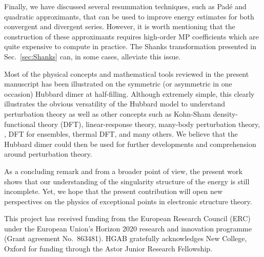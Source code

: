 \documentclass[aps,prb,reprint,noshowkeys,superscriptaddress]{revtex4-1}
\begin{document}
Finally, we have discussed several resummation techniques, such as Pad\'e and quadratic approximants, that can be used to improve energy estimates for both convergent and divergent series.
However, it is worth mentioning that the construction of these approximants requires high-order MP coefficients which are quite expensive to compute in practice.
The Shanks transformation presented in Sec.~\ref{sec:Shanks} can, in some cases, alleviate this issue.

Most of the physical concepts and mathematical tools reviewed in the present manuscript has been illustrated on the symmetric (or asymmetric in one occasion) Hubbard dimer at half-filling.
Although extremely simple, this clearly illustrates the obvious versatility of the Hubbard model to understand perturbation theory as well as other concepts such as Kohn-Sham density-functional theory (DFT), \cite{Carrascal_2015} linear-response theory, \cite{Carrascal_2018} many-body perturbation theory, \cite{Romaniello_2009,Romaniello_2012,DiSabatino_2015,Tarantino_2017}, DFT for ensembles, \cite{Deur_2017,Deur_2018,Senjean_2018,Sagredo_2018,Fromager_2020} thermal DFT, \cite{Smith_2016,Smith_2018} and many others.
We believe that the Hubbard dimer could then be used for further developments and comprehension around perturbation theory.

As a concluding remark and from a broader point of view, the present work shows that our understanding of the singularity structure of the energy is still incomplete.
Yet, we hope that the present contribution will open new perspectives on the physics of exceptional points in electronic structure theory.

\begin{acknowledgements}
This project has received funding from the European Research Council (ERC) under the European Union's Horizon 2020 research and innovation programme (Grant agreement No.~863481).
HGAB gratefully acknowledges New College, Oxford for funding through the Astor Junior Research Fellowship.
\end{acknowledgements}


\end{document}
